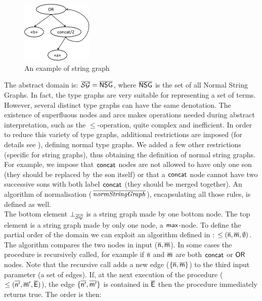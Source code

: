 \documentclass[orivec]{llncs}
\begin{document}
\begin{figure}
  \begin{center}
    \includegraphics[width=3.4cm]{sg.eps}
  \end{center}
\caption{An example of string graph}
 \label{fig:stringGraph}
\vspace{-10pt}
\end{figure}
The abstract domain is: $\mathsf{\overline{\mathsf{\mathcal{SG}}}} = \mathsf{\overline{NSG}}$, where $\mathsf{\overline{NSG}}$ is the set of all Normal String Graphs. In fact, the type graphs are very suitable for representing a set of terms. However, several distinct type graphs can have the same denotation. The existence of superfluous nodes and arcs makes operations needed during abstract interpretation, such as the $\le$-operation, quite complex and inefficient. In order to reduce this variety of type graphs, additional restrictions are imposed (for details see \cite{JAN92}), defining normal type graphs. We added a few other restrictions (specific for string graphs), thus obtaining the definition of normal string graphs. For example, we impose that $\mathsf{concat}$ nodes are not allowed to have only one son (they should be replaced by the son itself) or that a $\mathsf{concat}$ node cannot have two successive sons with both label $\mathsf{concat}$ (they should be merged together). An algorithm of normalisation ($\overline{\mathit{normStringGraph}}$), encapsulating all those rules, is defined as well.\\
The bottom element $\bot_{\mathsf{\overline{\mathsf{\mathcal{SG}}}}}$ is a string graph made by one bottom node. The top element is a string graph made by only one node, a $\mathsf{max}$-node. To define the partial order of the domain we can exploit an algorithm defined in \cite{JAN92}: $\le(\mathsf{\overline{n}},\mathsf{\overline{m}},\emptyset)$. The algorithm compares the two nodes in input ($\mathsf{\overline{n}}, \mathsf{\overline{m}}$). In some cases the procedure is recursively called, for example if $\mathsf{\overline{n}}$ and $\mathsf{\overline{m}}$ are both $\mathsf{concat}$ or $\mathsf{OR}$ nodes. Note that the recursive call adds a new edge ($\{\mathsf{\overline{n}}, \mathsf{\overline{m}}\}$) to the third input parameter (a set of edges). If, at the next execution of the procedure ($\le(\mathsf{\overline{n^\prime}}, \mathsf{\overline{m}}^\prime, \mathsf{\overline{E}})$), the edge $\{\mathsf{\overline{n^\prime}}, \mathsf{\overline{m^\prime}}\}$ is contained in $\mathsf{\overline{E}}$ then the procedure immediately returns true. The order is then:
 
\end{document}
